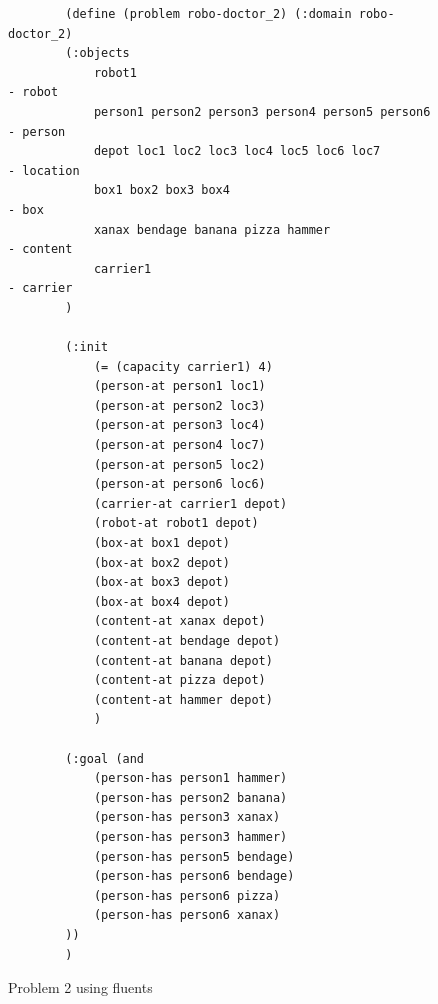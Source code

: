 \begin{figure}
    \begin{verbatim}
        (define (problem robo-doctor_2) (:domain robo-doctor_2)
        (:objects 
            robot1                                              - robot
            person1 person2 person3 person4 person5 person6     - person
            depot loc1 loc2 loc3 loc4 loc5 loc6 loc7            - location
            box1 box2 box3 box4                                 - box
            xanax bendage banana pizza hammer                   - content
            carrier1                                            - carrier
        )

        (:init
            (= (capacity carrier1) 4)
            (person-at person1 loc1)
            (person-at person2 loc3)
            (person-at person3 loc4)
            (person-at person4 loc7)
            (person-at person5 loc2)
            (person-at person6 loc6)
            (carrier-at carrier1 depot)
            (robot-at robot1 depot)
            (box-at box1 depot)
            (box-at box2 depot)
            (box-at box3 depot)
            (box-at box4 depot)
            (content-at xanax depot)
            (content-at bendage depot)
            (content-at banana depot)
            (content-at pizza depot)
            (content-at hammer depot)
            )

        (:goal (and
            (person-has person1 hammer)
            (person-has person2 banana)
            (person-has person3 xanax)
            (person-has person3 hammer)
            (person-has person5 bendage)
            (person-has person6 bendage)
            (person-has person6 pizza)
            (person-has person6 xanax)
        ))
        )
    \end{verbatim}
    \caption{Problem 2 using fluents}
    \label{problem2_problem_fluents}
\end{figure}

